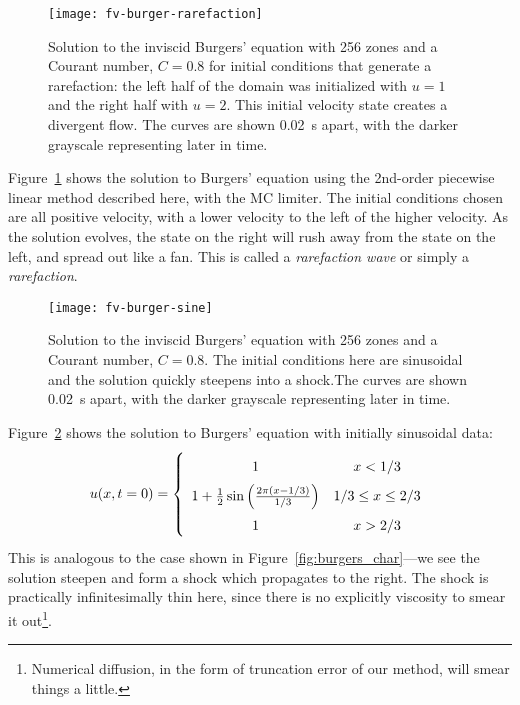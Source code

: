 \begin{figure}[t]
\centering
\texttt{[image: fv-burger-rarefaction]}
\caption[Rarefaction solution to the inviscid Burgers'
  equation]{\label{fig:burgers-rarefaction} Solution to the inviscid
  Burgers' equation with 256 zones and a Courant number, $C = 0.8$ for
  initial conditions that generate a rarefaction: the left half of the
  domain was initialized with $u = 1$ and the right half with $u = 2$.
  This initial velocity state creates a divergent flow.  The curves
  are shown 0.02~s apart, with the darker grayscale representing later
  in
  time. \\ }
\end{figure}


Figure~\ref{fig:burgers-rarefaction} shows the solution to Burgers'
equation using the 2nd-order piecewise linear method described here,
with the MC limiter.  The initial conditions chosen are all positive
velocity, with a lower velocity to the left of the higher velocity.
As the solution evolves, the state on the right will rush away from
the state on the left, and spread out like a fan.  This is called a
{\em rarefaction wave} or simply a {\em rarefaction}.

\begin{figure}[t]
\centering
\texttt{[image: fv-burger-sine]}
\caption[Shock solutions to the inviscid Burgers'
  equation]{\label{fig:burgers-shock} Solution to the inviscid
  Burgers' equation with 256 zones and a Courant number, $C = 0.8$.
  The initial conditions here are sinusoidal and the solution quickly
  steepens into a shock.The curves are shown 0.02~s apart, with the
  darker grayscale representing later in
  time. \\ }
\end{figure}

Figure~\ref{fig:burgers-shock} shows the solution to Burgers'
equation with initially sinusoidal data:
\begin{equation}
\label{eq:burgers:shockic}
\renewcommand{\arraystretch}{1.75}
u(x, t=0) = \left \{ \begin{array}{cc}
    1   & x < 1/3 \\
    1 + \frac{1}{2} \sin\left (\frac{2\pi (x - 1/3)}{1/3}\right ) & 1/3 \le x \le 2/3 \\
    1   & x > 2/3
\end{array}
\right .
\renewcommand{\arraystretch}{1.0}
\end{equation}
This is analogous to the case shown in
Figure~\ref{fig:burgers_char}---we see the solution steepen and form a
shock which propagates to the right.  The shock is practically infinitesimally thin
here, since there is no explicitly viscosity to smear it out\footnote{Numerical diffusion,
in the form of truncation error of our method, will smear things a little.}.

